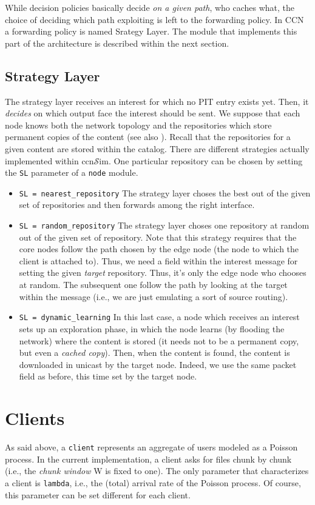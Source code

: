 \documentclass{book}
\newcommand{\ccnsim}{ccn$\mathcal{S}$im}
\begin{document}
While decision policies basically decide \emph{on a given path}, who caches what, the choice of deciding which path exploiting is left to the forwarding policy. In CCN a forwarding policy is named Srategy Layer. The module that implements this part of the architecture is described within the next section.

\subsection{Strategy Layer}
The strategy layer receives an interest for which no PIT entry exists yet. Then, it \emph{decides} on which output face the interest should be sent. We suppose that each node knows both the network topology and the repositories which store permanent copies of the content (see also ). Recall that the repositories for a given content are stored within the catalog. There are different strategies actually implemented within \ccnsim. One particular repository can be chosen by setting the \verb|SL| parameter of a \verb|node| module. 
\begin{itemize}
    \item \verb|SL = nearest_repository| The strategy layer choses the best out of the given set of repositories and then forwards among the right interface. 
    \item \verb|SL = random_repository|  The strategy layer choses one repository at random out of the given set of repository. Note that this strategy requires that the core nodes follow the path chosen by the edge node (the node to which the client is attached to). Thus, we need a field within the interest message for setting the given \emph{target} repository. Thus, it's only the edge node who chooses at random. The subsequent one follow the path by looking at the target within the message (i.e., we are just emulating a sort of source routing). 
    \item \verb|SL = dynamic_learning| In this last case, a node which receives an interest sets up an exploration phase, in which the node learns (by flooding the network) where the content is stored (it needs not to be a permanent copy, but even a \emph{cached copy}). Then, when the content is found, the content is downloaded in unicast by the target node. Indeed, we use the same packet field as before, this time set by the target node. 
\end{itemize}

\section{Clients}
As said above, a \verb|client| represents an aggregate of users modeled as a Poisson process. In the current implementation, a client asks for files chunk by chunk (i.e., the \emph{chunk window} W is fixed to one). The only parameter that characterizes a client is \verb|lambda|, i.e., the (total) arrival rate of the Poisson process. Of course, this parameter can be set different for each client. 
\end{document}
